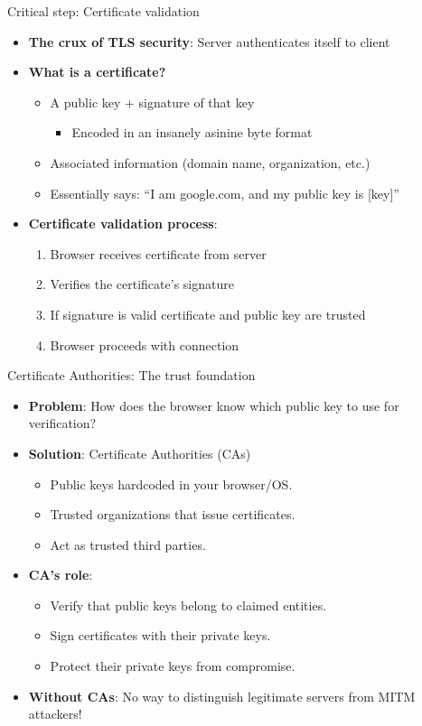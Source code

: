 \documentclass[aspectratio=169, lualatex, handout]{beamer}
\begin{document}
\begin{frame}{Critical step: Certificate validation}
	\begin{itemize}
		\item \textbf{The crux of TLS security}: Server authenticates itself to client
		\item \textbf{What is a certificate?}
		      \begin{itemize}
			      \item A public key + signature of that key
			            \begin{itemize}
				            \item Encoded in an insanely asinine byte format
			            \end{itemize}
			      \item Associated information (domain name, organization, etc.)
			      \item Essentially says: ``I am google.com, and my public key is [key]''
		      \end{itemize}
		\item \textbf{Certificate validation process}:
		      \begin{enumerate}
			      \item Browser receives certificate from server
			      \item Verifies the certificate's signature
			      \item If signature is valid \rightarrow certificate and public key are trusted
			      \item Browser proceeds with connection
		      \end{enumerate}
	\end{itemize}
\end{frame}

\begin{frame}{Certificate Authorities: The trust foundation}
	\begin{itemize}
		\item \textbf{Problem}: How does the browser know which public key to use for verification?
		\item \textbf{Solution}: Certificate Authorities (CAs)
		      \begin{itemize}
			      \item Public keys hardcoded in your browser/OS.
			      \item Trusted organizations that issue certificates.
			      \item Act as trusted third parties.
		      \end{itemize}
		\item \textbf{CA's role}:
		      \begin{itemize}
			      \item Verify that public keys belong to claimed entities.
			      \item Sign certificates with their private keys.
			      \item Protect their private keys from compromise.
		      \end{itemize}
		\item \textbf{Without CAs}: No way to distinguish legitimate servers from MITM attackers!
	\end{itemize}
\end{frame}
\end{document}
